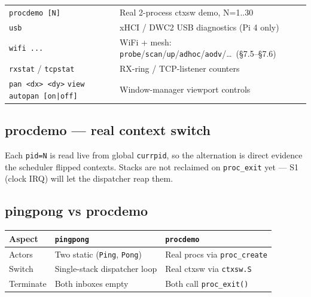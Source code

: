 \documentclass[a4paper,11pt]{article}
\begin{document}
\begin{center}
\begin{longtable}{@{}l p{9.0cm}@{}}
\verb|procdemo [N]|       & Real 2-process ctxsw demo, N=1..30\\
\verb|usb|               & xHCI / DWC2 USB diagnostics (Pi 4 only)\\
\verb|wifi ...|           & WiFi + mesh: \verb|probe|/\verb|scan|/\verb|up|/\verb|adhoc|/\verb|aodv|/\dots\ (§7.5--§7.6)\\
\verb|rxstat| / \verb|tcpstat| & RX-ring / TCP-listener counters\\
\verb|pan <dx> <dy>| \verb|view| \verb!autopan [on|off]! & Window-manager viewport controls\\
\bottomrule
\end{longtable}
\end{center}

\subsection{procdemo --- real context switch}
Each \verb|pid=N| is read live from global \verb|currpid|, so the alternation
is direct evidence the scheduler flipped contexts. Stacks are not reclaimed on
\verb|proc_exit| yet --- S1 (clock IRQ) will let the dispatcher reap them.

\subsection{pingpong vs procdemo}
\begin{center}\footnotesize
\begin{tabular}{@{}l p{4.4cm} p{5.0cm}@{}}
\toprule
\textbf{Aspect} & \verb|pingpong| & \verb|procdemo|\\
\midrule
Actors     & Two static (\verb|Ping|, \verb|Pong|) & Real procs via \verb|proc_create|\\
Switch     & Single-stack dispatcher loop & Real ctxsw via \verb|ctxsw.S|\\
Terminate  & Both inboxes empty & Both call \verb|proc_exit()|\\
\bottomrule
\end{tabular}
\end{center}
\end{document}
